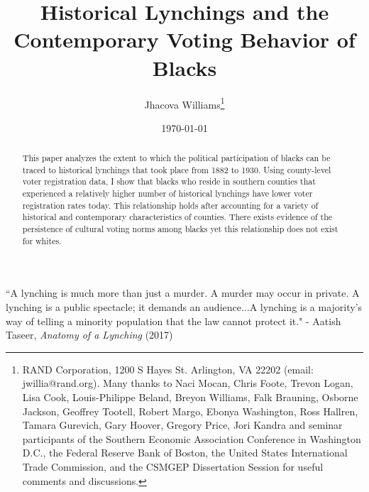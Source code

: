 \documentclass[AEJ, finalmode]{AEA}
\begin{document}
\title{Historical Lynchings and the Contemporary Voting Behavior of Blacks}
\author{Jhacova Williams\thanks{RAND Corporation, 1200 S Hayes St. Arlington, VA 22202 (email: jwillia@rand.org). Many thanks to Naci Mocan, Chris Foote, Trevon Logan, Lisa Cook, Louis-Philippe Beland, Breyon Williams, Falk Brauning, Osborne Jackson, Geoffrey Tootell, Robert Margo, Ebonya Washington, Ross Hallren, Tamara Gurevich, Gary Hoover, Gregory Price, Jori Kandra and seminar participants of the Southern Economic Association Conference in Washington D.C., the Federal Reserve Bank of Boston, the United States International Trade Commission, and the CSMGEP Dissertation Session for useful comments and discussions.}}
\date{\today} 


\begin{abstract}
This paper analyzes the extent to which the political participation of blacks can be traced to historical lynchings that took place from 1882 to 1930. Using county-level voter registration data, I show that blacks who reside in southern counties that experienced a relatively higher number of historical lynchings have lower voter registration rates today. This relationship holds after accounting for a variety of historical and contemporary characteristics of counties. There exists evidence of the persistence of cultural voting norms among blacks yet this relationship does not exist for whites.  
\end{abstract}

\maketitle

``A lynching is much more than just a murder. A murder may occur in private. A lynching is a public spectacle; it demands an audience...A lynching is a majority's way of telling a minority population that the law cannot protect it." - Aatish Taseer, \textit{Anatomy of a Lynching} (2017) 
\end{document}
